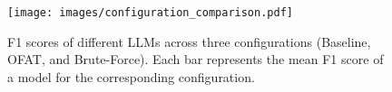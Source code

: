 \begin{figure}[ht]
    \centering
    \texttt{[image: images/configuration\_comparison.pdf]}
    \caption{F1 scores of different LLMs across three configurations (Baseline, OFAT, and Brute-Force). Each bar represents the mean F1 score of a model for the corresponding configuration.}
    \label{fig:configuration_comparison}
\end{figure}

